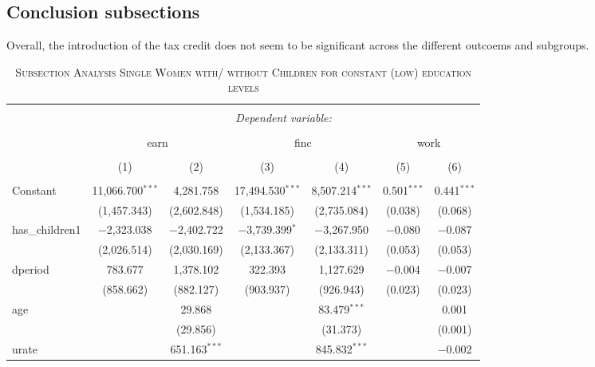 \documentclass[a4paper]{article}
\begin{document}
\subsection{Conclusion subsections}  
Overall, the introduction of the tax credit does not seem to be significant across the different outcoems and subgroups. 

\begin{table}[!htbp] \centering 
\begin{adjustwidth}{0.cm}{-0cm}
\begin{threeparttable}
\small
\captionsetup{font=small, justification=raggedright,singlelinecheck=false}
\caption{\textsc{Subsection Analysis Single Women with/ without Children for constant (low) education levels}}
\centering 
  \label{}
\small 
\begin{tabular}{@{\extracolsep{-2pt}}lcccccc} 
\\[-5.8ex]\hline 
\hline \\[-1.8ex] 
 & \multicolumn{6}{c}{\textit{Dependent variable:}} \\ 
\cline{2-7} 
\\[-1.8ex] & \multicolumn{2}{c}{earn} & \multicolumn{2}{c}{finc} & \multicolumn{2}{c}{work} \\ 
\\[-1.8ex] & (1) & (2) & (3) & (4) & (5) & (6)\\ 
\hline \\[-1.8ex] 
 Constant & 11,066.700$^{***}$ & 4,281.758 & 17,494.530$^{***}$ & 8,507.214$^{***}$ & 0.501$^{***}$ & 0.441$^{***}$ \\ 
  & (1,457.343) & (2,602.848) & (1,534.185) & (2,735.084) & (0.038) & (0.068) \\ 
  has\_children1 & $-$2,323.038 & $-$2,402.722 & $-$3,739.399$^{*}$ & $-$3,267.950 & $-$0.080 & $-$0.087 \\ 
  & (2,026.514) & (2,030.169) & (2,133.367) & (2,133.311) & (0.053) & (0.053) \\ 
  dperiod & 783.677 & 1,378.102 & 322.393 & 1,127.629 & $-$0.004 & $-$0.007 \\ 
  & (858.662) & (882.127) & (903.937) & (926.943) & (0.023) & (0.023) \\ 
  age &  & 29.868 &  & 83.479$^{***}$ &  & 0.001 \\ 
  &  & (29.856) &  & (31.373) &  & (0.001) \\ 
  urate &  & 651.163$^{***}$ &  & 845.832$^{***}$ &  & $-$0.002 \\ 

\end{tabular}
\end{threeparttable}
\end{adjustwidth}
\end{table}
\end{document}
